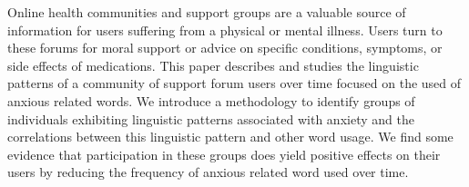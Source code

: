 Online health communities and support groups are a valuable source of information for users suffering from a physical or mental illness. Users turn to these forums for moral support or advice on specific conditions, symptoms, or side effects of medications. This paper describes and studies the linguistic patterns of a community of support forum users over time focused on the used of anxious related words. We introduce a methodology to identify groups of individuals exhibiting linguistic patterns associated with anxiety and the correlations between this linguistic pattern and other word usage. We find some evidence that participation in these groups does yield positive effects on their users by reducing the frequency of anxious related word used over time.
